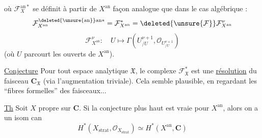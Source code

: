 où $\mathcal F_X^{\mathrm{an}*}$ se  définit à partir de $X^{\mathrm{an}}$  façon analogue que dans le cas algébrique :
\[
\mathcal F_{X^{\mathrm{an}}}^{\deleted{\unsure{\mathrm{an}}}\mathrm{an}*}
=\mathcal F_{X^{\mathrm{an}}}^*
=\deleted{\unsure{\mathcal F}}\mathcal F_{X^{\mathrm{an}}}^{\nu}
\]
\[
\mathcal F_{X^{\mathrm{an}}}^{\nu}:\quad U\longmapsto\Gamma(U^{\nu+1}_{/U},\mathcal O_{U^{\nu+1}_{/U}})
\]
(où $U$ parcourt les ouverts de $X^{\mathrm{an}}$).

\uline{Conjecture} Pour tout espace analytique $\mathfrak X$, le complexe $\mathcal F_{\mathfrak X}^*$ est une \uline{résolution} du faisceau $\mathbf C_{\mathfrak X}$ (via l'augmentation triviale).
\margin{[Alors pour $X$ prop, on a $H^*(\mathfrak X_{\mathrm{str}},\mathcal O_{\mathfrak X_{\mathrm{str}}})=H^*(\mathfrak X,\mathbf C)$]}
Cela semble plausible, en regardant les ``fibres formelles'' des faisceaux...

\uline{Th} Soit $X$ propre sur $\mathbf C$. Si la conjecture plus haut est vraie pour $X^{\mathrm{an}}$, alors on a un isom can
\[
H^*(X_{\mathrm{strat}},\mathcal O_{X_{\mathrm{strat}}})\simeq H^*(X^{\mathrm{an}},\mathbf C)
\]
